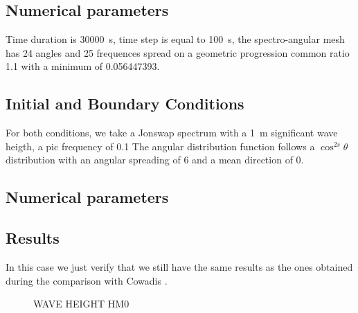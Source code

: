 %
\subsection{Numerical parameters}
%
Time duration is 30000~s, time step is equal to 100~s, the spectro-angular mesh has 24 angles and 25 frequences spread on a geometric progression common ratio 1.1 with a minimum of 0.056447393.

\subsection{Initial and Boundary Conditions}
%
For both conditions, we take a Jonswap spectrum with a 1~m significant wave heigth, a pic frequency of 0.1 The angular distribution function follows a $\cos^{2s} \theta$ distribution with an angular spreading of 6 and a mean direction of 0.

\subsection{Numerical parameters}


%
%
\subsection{Results}
In this case we just verify that we still have the same results as the ones obtained during the comparison with Cowadis \cite{cowadis}.
\begin{figure} [!h]
\centering
{}
 \caption{WAVE HEIGHT HM0}\label{resultsbf}
\end{figure}
